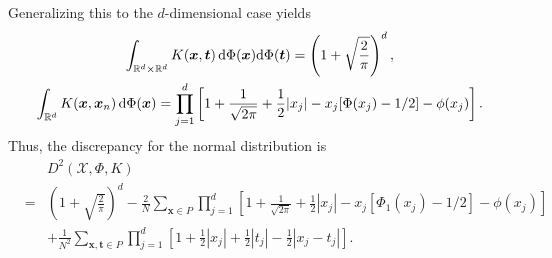 \documentclass[graybox]{svmult}
\newcommand{\reals}{\mathbb{R}}
\newcommand{\vx}{\boldsymbol{x}}
\newcommand{\vt}{\boldsymbol{t}}
\newcommand{\dif}{{\rm d}}
\newcommand{\Xdes}{\mathcal{X}}
\begin{document}
Generalizing this to the $d$-dimensional case yields 
\begin{gather*}
\int_{\reals^d\times \reals^d} K(\vx,\vt) \, \dif\Phi(\vx)\dif\Phi(\vt) = \left(1+\sqrt{\frac{2}{\pi}}\right)^d, \\
\int_{\reals^d}K(\vx,\vx_n) \, \dif\Phi(\vx) = \prod\limits_{j=1}^d \left[ 1+\frac{1}{\sqrt{2\pi}}+\frac{1}{2}|x_j|-x_j[\Phi(x_j)-1/2]-\phi(x_j)\right].
\end{gather*}
Thus, the discrepancy for the normal distribution is
\begin{eqnarray*}
&&D^2(\Xdes, \Phi, K)\\
&=& \left(1+\sqrt{\frac{2}{\pi}}\right)^d - \frac{2}{N}\sum\limits_{\vx\in P} \prod\limits_{j=1}^d\left[ 1+\frac{1}{\sqrt{2\pi}}+\frac{1}{2}|x_j|-x_j[\Phi_1(x_j)-1/2]-\phi(x_j)\right]\\
&&+\frac{1}{N^2}\sum_{\vx,\vt\in P}\prod_{j=1}^d \left[1+\frac{1}{2}|x_j|+\frac{1}{2}|t_j|-\frac{1}{2}|x_j-t_j|\right]. 
\end{eqnarray*}      
\end{document}
